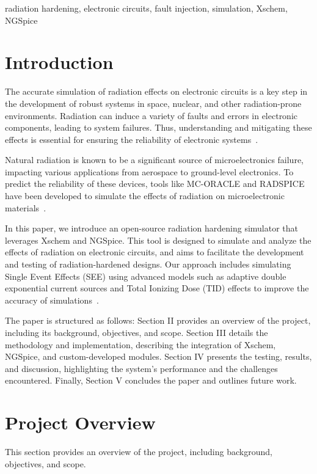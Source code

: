 \documentclass[conference]{IEEEtran}
\begin{document}
    \begin{IEEEkeywords}
        radiation hardening, electronic circuits, fault injection, simulation, Xschem, NGSpice
    \end{IEEEkeywords}


    \section{Introduction}\label{sec:introduction}
    The accurate simulation of radiation effects on electronic circuits is a key step in the development of robust systems in space, nuclear, and other radiation-prone environments.
    Radiation can induce a variety of faults and errors in electronic components, leading to system failures.
    Thus, understanding and mitigating these effects is essential for ensuring the reliability of electronic systems~\cite{Wrobel2011, Florian1986}.

    Natural radiation is known to be a significant source of microelectronics failure, impacting various applications from aerospace to ground-level electronics.
    To predict the reliability of these devices, tools like MC-ORACLE and RADSPICE have been developed to simulate the effects of radiation on microelectronic materials~\cite{Wrobel2011, Florian1986}.

    In this paper, we introduce an open-source radiation hardening simulator that leverages Xschem and NGSpice.
    This tool is designed to simulate and analyze the effects of radiation on electronic circuits, and aims to facilitate the development and testing of radiation-hardened designs.
    Our approach includes simulating Single Event Effects (SEE) using advanced models such as adaptive double exponential current sources and Total Ionizing Dose (TID) effects to improve the accuracy of simulations~\cite{Pepper1990}.

    The paper is structured as follows: Section II provides an overview of the project, including its background, objectives, and scope.
    Section III details the methodology and implementation, describing the integration of Xschem, NGSpice, and custom-developed modules.
    Section IV presents the testing, results, and discussion, highlighting the system's performance and the challenges encountered.
    Finally, Section V concludes the paper and outlines future work.


    \section{Project Overview}\label{sec:project-overview}
    This section provides an overview of the project, including background, objectives, and scope.
\end{document}
